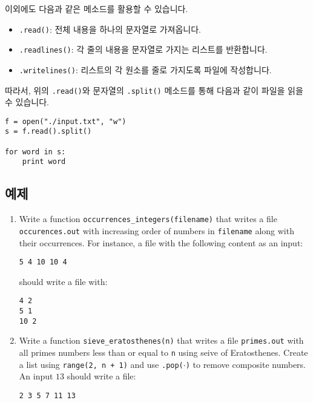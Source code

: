 \documentclass[../main.tex]{subfiles}
\begin{document}
이외에도 다음과 같은 메소드를 활용할 수 있습니다.
\begin{itemize}
	\item \texttt{.read()}: 전체 내용을 하나의 문자열로 가져옵니다.
	\item \texttt{.readlines()}: 각 줄의 내용을 문자열로 가지는 리스트를 반환합니다.
	\item \texttt{.writelines()}: 리스트의 각 원소를 줄로 가지도록 파일에 작성합니다.
\end{itemize}
따라서, 위의 \texttt{.read()}와 문자열의 \texttt{.split()} 메소드를 통해 다음과 같이 파일을 읽을 수 있습니다.
\begin{verbatim}
f = open("./input.txt", "w")
s = f.read().split()

for word in s:
	print word
\end{verbatim}


\subsection{예제}
\begin{enumerate}
\item Write a function \texttt{occurrences\_integers(filename)} that writes a file \texttt{occurences.out} with increasing order of numbers in \texttt{filename} along with their occurrences.
For instance, a file with the following content as an input:
\begin{verbatim}
5 4 10 10 4
\end{verbatim}
should write a file with:
\begin{verbatim}
4 2
5 1
10 2
\end{verbatim}

\item Write a function \texttt{sieve\_eratosthenes(n)} that writes a file \texttt{primes.out} with all primes numbers less than or equal to \texttt{n} using seive of Eratosthenes.
Create a list using \texttt{range(2, n + 1)} and use \texttt{.pop($\cdot$)} to remove composite numbers.
An input $13$ should write a file:
\begin{verbatim}
2 3 5 7 11 13
\end{verbatim}
\end{enumerate}
\end{document}
